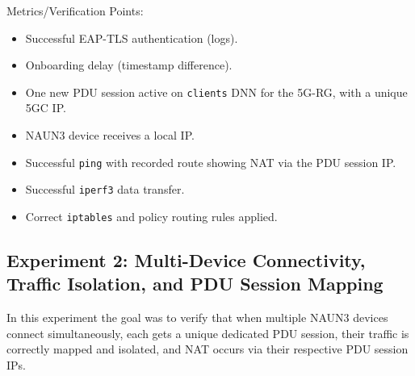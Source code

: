 Metrics/Verification Points:
\begin{itemize}
    \item Successful \ac{EAP-TLS} authentication (logs).
    \item Onboarding delay (timestamp difference).
    \item One new \ac{PDU} session active on \texttt{clients} \ac{DNN} for the \ac{5G-RG}, with a unique \ac{5GC} \ac{IP}.
    \item \ac{NAUN3} device receives a local \ac{IP}.
    \item Successful \texttt{ping} with recorded route showing \ac{NAT} via the \ac{PDU} session \ac{IP}.
    \item Successful \texttt{iperf3} data transfer.
    \item Correct \texttt{iptables} and policy routing rules applied.
\end{itemize}

\subsection{Experiment 2: Multi-Device Connectivity, Traffic Isolation, and \acs{PDU} Session Mapping}

In this experiment the goal was to verify that when multiple \ac{NAUN3} devices connect simultaneously, each gets a unique dedicated \ac{PDU} session, their traffic is correctly mapped and isolated, and \ac{NAT} occurs via their respective \ac{PDU} session \acp{IP}.

